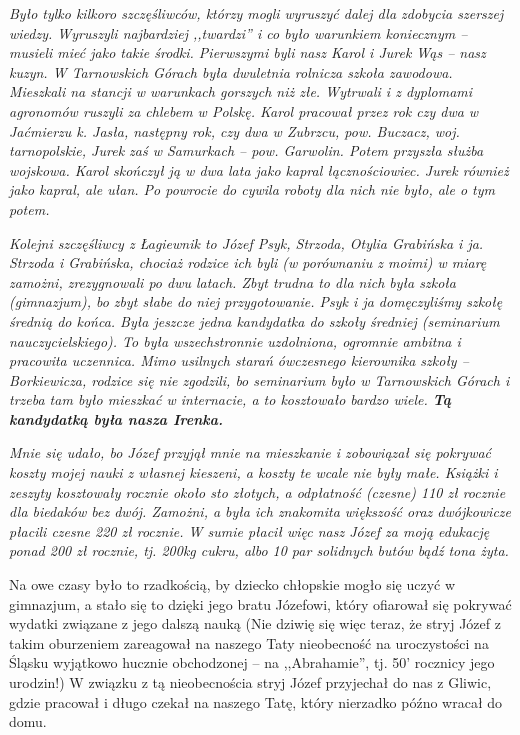\textit{Było tylko kilkoro szczęśliwców, którzy mogli wyruszyć dalej dla zdobycia szerszej wiedzy. Wyruszyli najbardziej ,,twardzi'' i co było warunkiem koniecznym -- musieli mieć jako takie środki. Pierwszymi byli nasz Karol i Jurek Wąs -- nasz kuzyn. W Tarnowskich Górach była dwuletnia rolnicza szkoła zawodowa. Mieszkali na stancji w warunkach gorszych niż złe. Wytrwali i z dyplomami agronomów ruszyli za chlebem w Polskę. Karol pracował przez rok czy dwa w Jaćmierzu k. Jasła, następny rok, czy dwa w Zubrzcu, pow. Buczacz, woj. tarnopolskie, Jurek zaś w Samurkach -- pow. Garwolin. Potem przyszła służba wojskowa. Karol skończył ją w dwa lata jako kapral łącznościowiec. Jurek również jako kapral, ale ułan. Po powrocie do cywila roboty dla nich nie było, ale o tym potem.}

\textit{Kolejni szczęśliwcy z Łagiewnik to Józef Psyk, Strzoda, Otylia Grabińska i ja. Strzoda i Grabińska, chociaż rodzice ich byli (w porównaniu z moimi) w miarę zamożni, zrezygnowali po dwu latach. Zbyt trudna to dla nich była szkoła (gimnazjum), bo zbyt słabe do niej przygotowanie. Psyk i ja domęczyliśmy szkołę średnią do końca. Była jeszcze jedna kandydatka do szkoły średniej (seminarium nauczycielskiego). To była wszechstronnie uzdolniona, ogromnie ambitna i pracowita uczennica. Mimo usilnych starań ówczesnego kierownika szkoły – Borkiewicza, rodzice się nie zgodzili, bo seminarium było w Tarnowskich Górach i trzeba tam było mieszkać w internacie, a to kosztowało bardzo wiele. \textbf{Tą kandydatką była nasza Irenka.}}

\textit{Mnie się udało, bo Józef przyjął mnie na mieszkanie i zobowiązał się pokrywać koszty mojej nauki z własnej kieszeni, a koszty te wcale nie były małe. Książki i zeszyty kosztowały rocznie około sto złotych, a odpłatność (czesne) 110 zł rocznie dla biedaków bez dwój. Zamożni, a była ich znakomita większość oraz dwójkowicze płacili czesne 220 zł rocznie. W sumie płacił więc nasz Józef za moją edukację ponad 200 zł rocznie, tj. 200kg cukru, albo 10 par solidnych butów bądź tona żyta.}


Na owe czasy było to rzadkością, by dziecko chłopskie mogło się uczyć w gimnazjum, a stało się to dzięki jego bratu Józefowi, który ofiarował się pokrywać wydatki związane z jego dalszą nauką (Nie dziwię się więc teraz, że stryj Józef z takim oburzeniem zareagował na naszego Taty nieobecność na uroczystości na Śląsku wyjątkowo hucznie obchodzonej -- na ,,Abrahamie'', tj. 50’ rocznicy jego urodzin!) W związku z tą nieobecnościa stryj Józef przyjechał do nas z Gliwic, gdzie pracował i długo czekał na naszego Tatę, który nierzadko późno wracał do domu.


